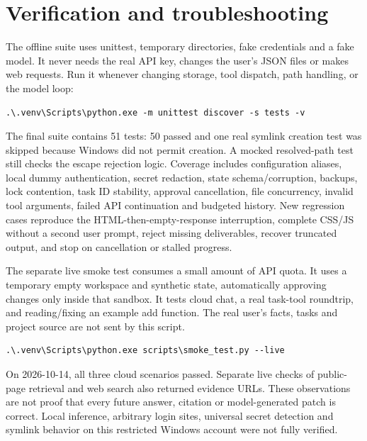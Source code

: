 \chapter{Verification and troubleshooting}

The offline suite uses unittest, temporary directories, fake credentials and a fake model. It never needs the real API key, changes the user's JSON files or makes web requests. Run it whenever changing storage, tool dispatch, path handling, or the model loop:

\begin{Verbatim}[breaklines,breakanywhere,fontsize=\small]
.\.venv\Scripts\python.exe -m unittest discover -s tests -v
\end{Verbatim}

The final suite contains 51 tests: 50 passed and one real symlink creation test was skipped because Windows did not permit creation. A mocked resolved-path test still checks the escape rejection logic. Coverage includes configuration aliases, local dummy authentication, secret redaction, state schema/corruption, backups, lock contention, task ID stability, approval cancellation, file concurrency, invalid tool arguments, failed API continuation and budgeted history. New regression cases reproduce the HTML-then-empty-response interruption, complete CSS/JS without a second user prompt, reject missing deliverables, recover truncated output, and stop on cancellation or stalled progress.

The separate live smoke test consumes a small amount of API quota. It uses a temporary empty workspace and synthetic state, automatically approving changes only inside that sandbox. It tests cloud chat, a real task-tool roundtrip, and reading/fixing an example add function. The real user's facts, tasks and project source are not sent by this script.

\begin{Verbatim}[breaklines,breakanywhere,fontsize=\small]
.\.venv\Scripts\python.exe scripts\smoke_test.py --live
\end{Verbatim}

On 2026-10-14, all three cloud scenarios passed. Separate live checks of public-page retrieval and web search also returned evidence URLs. These observations are not proof that every future answer, citation or model-generated patch is correct. Local inference, arbitrary login sites, universal secret detection and symlink behavior on this restricted Windows account were not fully verified.

